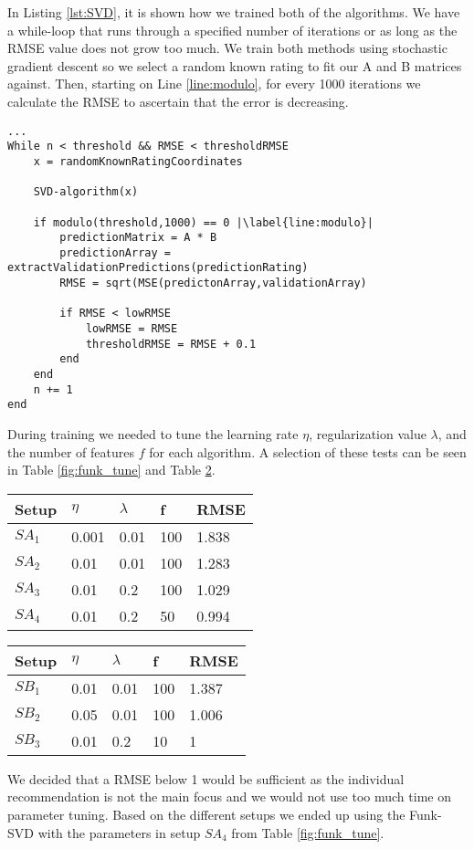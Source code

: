 In Listing \ref{lst:SVD}, it is shown how we trained both of the algorithms. We have a while-loop that runs through a specified number of iterations or as long as the RMSE value does not grow too much.
We train both methods using stochastic gradient descent so we select a random known rating to fit our A and B matrices against. Then, starting on Line \ref{line:modulo}, for every 1000 iterations we calculate the RMSE to ascertain that the error is decreasing. 

\begin{lstlisting}[caption={Training of the prediction matrix},label=lst:SVD,escapechar=|]
...
While n < threshold && RMSE < thresholdRMSE
	x = randomKnownRatingCoordinates
	
	SVD-algorithm(x)
	
	if modulo(threshold,1000) == 0 |\label{line:modulo}|
		predictionMatrix = A * B
		predictionArray = extractValidationPredictions(predictionRating)
		RMSE = sqrt(MSE(predictonArray,validationArray)	
		
		if RMSE < lowRMSE 
			lowRMSE = RMSE 
			thresholdRMSE = RMSE + 0.1
		end
	end
	n += 1
end
\end{lstlisting}

During training we needed to tune the learning rate $\eta$, regularization value $\lambda$, and the number of features $f$ for each algorithm. A selection of these tests can be seen in Table \ref{fig:funk_tune} and Table \ref{fig:SVD_tune}.
\begin{table}[h]
\centering
\begin{minipage}{.48\textwidth}\centering
\begin{tabular}{|l|llll|}
\hline
Setup	& $\eta$ & $\lambda$ & f   & RMSE   \\ \hline
$SA_1$	& 0.001  & 0.01      & 100 & 1.838 \\ \hline
$SA_2$	& 0.01   & 0.01      & 100 & 1.283 \\ \hline
$SA_3$	& 0.01   & 0.2       & 100 & 1.029 \\ \hline
$SA_4$	& 0.01   & 0.2		 & 50  & 0.994 \\ \hline
\end{tabular}
\label{fig:funk_tune}
\end{minipage}
\hfill
\begin{minipage}{.48\textwidth}\centering
\begin{tabular}{|l|llll|}
\hline
Setup	& $\eta$ & $\lambda$ & f   & RMSE \\ \hline
$SB_1$	& 0.01   & 0.01   & 100 & 1.387   \\ \hline
$SB_2$	& 0.05   & 0.01   & 100 & 1.006  \\ \hline
$SB_3$	& 0.01   & 0.2    & 10 	& 1		  \\ \hline
\end{tabular}
\label{fig:SVD_tune}
\end{minipage}
\end{table}

We decided that a RMSE below 1 would be sufficient as the individual recommendation is not the main focus and we would not use too much time on parameter tuning. Based on the different setups we ended up using the Funk-SVD with the parameters in setup $SA_4$ from Table \ref{fig:funk_tune}.